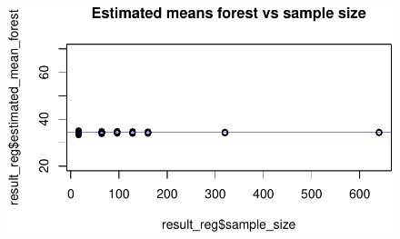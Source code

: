 \documentclass[
  letterpaper,
  DIV=11,
  numbers=noendperiod]{scrartcl}
\begin{document}
\begin{figure}[H]

{\centering \includegraphics{Regression_estimator_files/figure-pdf/unnamed-chunk-6-1.pdf}

}

\end{figure}
\end{document}
